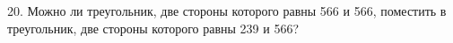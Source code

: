 20. Можно ли треугольник, две стороны которого равны 566 и 566, поместить в треугольник, две стороны которого равны 239 и 566?\\
